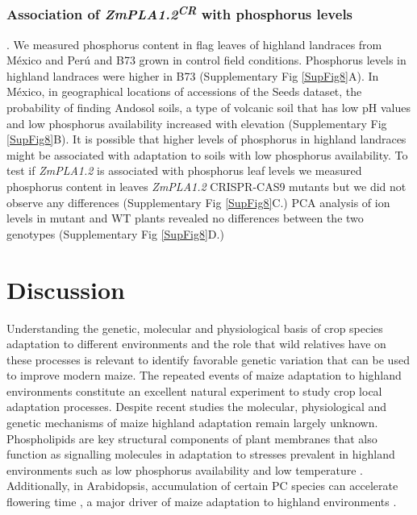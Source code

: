 \documentclass[9pt,twocolumn,twoside,lineno]{BioRxiv}
\begin{document}
\subsubsection{Association of \textit{ZmPLA1.2\textsuperscript{CR}} with phosphorus levels}.
We measured phosphorus content in flag leaves of highland landraces from México and Perú and B73 grown in control field conditions. Phosphorus levels in highland landraces were higher in B73 (Supplementary Fig \ref{SupFig8}A). 
In México, in geographical locations of accessions of the Seeds dataset, the probability of finding Andosol soils, a type of volcanic soil that has low pH values and low phosphorus availability increased with elevation (Supplementary Fig \ref{SupFig8}B).
It is possible that higher levels of phosphorus in highland landraces might be associated with adaptation to soils with low phosphorus availability. 
To test if \textit{ZmPLA1.2} is associated with phosphorus leaf levels we measured phosphorus content in leaves \textit{ZmPLA1.2} CRISPR-CAS9 mutants but we did not observe any differences (Supplementary Fig \ref{SupFig8}C.) 
PCA analysis of ion levels in mutant and WT plants revealed no differences between the two genotypes (Supplementary Fig \ref{SupFig8}D.) 

\section{Discussion}
\label{sec:discussion}
Understanding the genetic, molecular and  physiological basis of crop species adaptation to different environments and the role that wild relatives have on these processes is relevant to identify favorable genetic variation that can be used to improve modern maize.
The repeated events of maize adaptation to highland environments constitute an excellent natural experiment to study crop local adaptation processes. 
Despite recent studies \cite{Wang2020-mp, Takuno2015-uj, Crow2020-gene} the molecular, physiological and genetic mechanisms of maize highland adaptation remain largely unknown.
Phospholipids are key structural components of plant membranes that also function as signalling molecules in adaptation to stresses prevalent in highland environments \cite{Ryu2004-iv, Nakamura2017-vb} such as low phosphorus availability \cite{Veneklaas2012-ls, Cruz-Ramirez2004-ib, Lambers2012-an} and low temperature \cite{Degenkolbe2012-wf, Welti2002-uk, Marla2017-ph}. 
Additionally, in Arabidopsis, accumulation of certain PC species can accelerate flowering time \cite{Nakamura2014-qf}, a major driver of maize adaptation to highland environments \cite{Romero_Navarro2017-cn, Gates2019-xu}.
 
\end{document}
